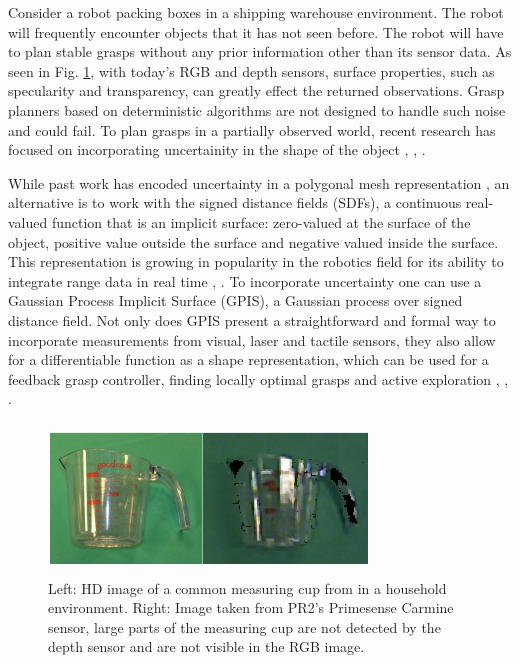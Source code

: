 \documentclass[letterpaper, 10 pt, conference]{ieeeconf}  %
\begin{document}
Consider a robot packing boxes in a shipping warehouse environment. The robot will frequently encounter objects that it has not seen before. The robot will have to plan stable grasps without any prior information other than its sensor data. As seen in Fig. \ref{fig:noisy data}, with today's RGB and depth sensors, surface properties, such as specularity and transparency, can greatly effect the returned observations. Grasp planners based on deterministic algorithms are not designed to handle such noise and could fail. To plan grasps in a partially observed world, recent research has focused on incorporating uncertainity%
 in the shape of the object \cite{kehoe2012estimating}, \cite{christopoulos2007handling}, \cite{zheng2005}. %

While past work has encoded uncertainty in a polygonal mesh representation \cite{kehoe2012estimating}, an alternative is to work with the signed distance fields (SDFs), a continuous real-valued function that is an implicit surface: zero-valued at the surface of the object, positive value outside the surface and negative valued inside the surface. This representation is growing in popularity in the robotics field for its ability to integrate range data in real time \cite{newcombe2011kinectfusion}, \cite{curless1996volumetric}. To incorporate uncertainty one can use a Gaussian Process Implicit Surface (GPIS), a Gaussian process over signed distance field. Not only does GPIS present a straightforward and formal way to incorporate measurements from visual, laser and tactile sensors, they also allow for a differentiable function as a shape representation, 
which can be used for a feedback grasp controller, finding locally optimal grasps and active exploration  \cite{dragiev2011}, \cite{jeffs}, \cite{hollinger2013}. 
 
\begin{figure}[ht!]
\centering
\includegraphics[width=8.5cm,height=4cm]{figures/Slide02.jpg}
\caption{Left: HD image of a common measuring cup from in a household environment. Right: Image taken from PR2's Primesense Carmine sensor, large parts of the measuring cup are not detected by the depth sensor and are not visible in the RGB image.}
\vspace*{-10pt}
\label{fig:noisy data}
\end{figure}
\end{document}
